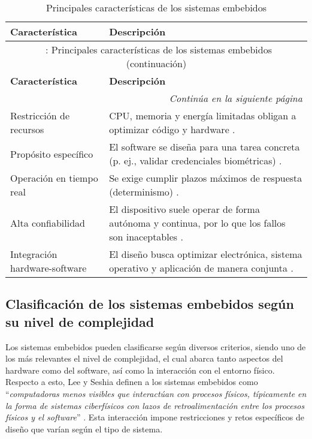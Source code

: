 \begin{longtable}{l|p{10cm}}
    \caption{Principales características de los sistemas embebidos} \label{tab:embedded_characteristics} \\
    \hline
    \textbf{Característica} & \textbf{Descripción} \\
    \hline
    \endfirsthead
    
    \multicolumn{2}{c}{\tablename\ \thetable{}: Principales características de los sistemas embebidos (continuación)} \\
    \hline
    \textbf{Característica} & \textbf{Descripción} \\
    \hline
    \endhead
    
    \hline
    \multicolumn{2}{r}{\textit{Continúa en la siguiente página}} \\
    \endfoot
    
    \hline
    \endlastfoot
    
    Restricción de recursos & CPU, memoria y energía limitadas obligan a optimizar código y hardware \cite{henriksson_2006}.\\
    Propósito  específico & El software se diseña para una tarea concreta (p. ej., validar credenciales biométricas) \cite{wolf_embedded_2012}.\\
    Operación en tiempo real & Se exige cumplir plazos máximos de respuesta (determinismo) \cite{shyamasundar_validating_2001}.\\
    Alta confiabilidad & El dispositivo suele operar de forma autónoma y continua, por lo que los fallos son inaceptables \cite{windriver_embedded_security}.\\
    Integración hardware-software & El diseño busca optimizar electrónica, sistema operativo y aplicación de manera conjunta \cite{wolf_embedded_2012}.\\
\end{longtable}


\subsection{Clasificación de los sistemas embebidos según su nivel de complejidad}

Los sistemas embebidos pueden clasificarse según diversos criterios, siendo uno de los más relevantes el nivel de complejidad, el cual abarca tanto aspectos del hardware como del software, así como la interacción con el entorno físico. Respecto a esto, Lee y Seshia definen a los sistemas embebidos como ``\textit{computadoras menos visibles que interactúan con procesos físicos, típicamente en la forma de sistemas ciberfísicos con lazos de retroalimentación entre los procesos físicos y el software}'' \cite{lee_introduction_2017}. Esta interacción impone restricciones y retos específicos de diseño que varían según el tipo de sistema.

